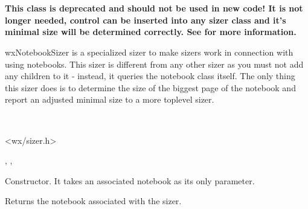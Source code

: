 \section{}\label{wxnotebooksizer}

{\bf This class is deprecated and should not be used in new code! It is not
longer needed,  control can be inserted
into any sizer class and it's minimal size will be determined correctly.
See  for more information.}

wxNotebookSizer is a specialized sizer to make sizers work in connection
with using notebooks. This sizer is different from any other sizer as 
you must not add any children to it - instead, it queries the notebook class itself.
The only thing this sizer does is to determine the size of the biggest
page of the notebook and report an adjusted minimal size to a more toplevel
sizer.


\\


<wx/sizer.h>


, , 


\label{wxnotebooksizerwxnotebooksizer}


Constructor. It takes an associated notebook as its only parameter.

\label{wxnotebooksizergetnotebook}


Returns the notebook associated with the sizer.

